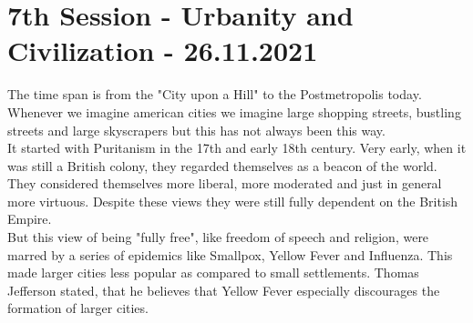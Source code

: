 \documentclass{article}
\begin{document}
	\section{7th Session - Urbanity and Civilization - 26.11.2021}
	The time span is from the "City upon a Hill" to the Postmetropolis today. Whenever we imagine american cities we imagine large shopping streets, bustling streets and large skyscrapers but this has not always been this way. \\
	It started with Puritanism in the 17th and early 18th century. Very early, when it was still a British colony, they regarded themselves as a beacon of the world. They considered themselves more liberal, more moderated and just in general more virtuous. Despite these views they were still fully dependent on the British Empire. \\
	But this view of being "fully free", like freedom of speech and religion, were marred by a series of epidemics like Smallpox, Yellow Fever and Influenza. This made larger cities less popular as compared to small settlements. Thomas Jefferson stated, that he believes that Yellow Fever especially discourages the formation of larger cities. \\
\end{document}
